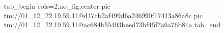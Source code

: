  
 
 
 
 

\qqSecOrig


\ifcmt
  tab_begin cols=2,no_fig,center
    pic tm://01_12_22.19.59.11@d17cb2af499d6a246990f17413a86a8c
    pic tm://01_12_22.19.59.11@ac684b55403beed73bf45f7a6a76b81a
  tab_end
\fi

